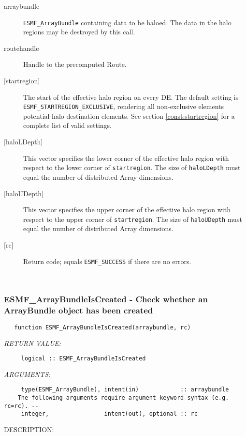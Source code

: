      \begin{description}
     \item [arraybundle]
       {\tt ESMF\_ArrayBundle} containing data to be haloed. The data in the halo
       regions may be destroyed by this call.
     \item [routehandle]
       Handle to the precomputed Route.
     \item [{[startregion]}]
       \begin{sloppypar}
       The start of the effective halo region on every DE. The default
       setting is {\tt ESMF\_STARTREGION\_EXCLUSIVE}, rendering all non-exclusive
       elements potential halo destination elements.
       See section \ref{const:startregion} for a complete list of
       valid settings.
       \end{sloppypar}
     \item[{[haloLDepth]}] 
       This vector specifies the lower corner of the effective halo
       region with respect to the lower corner of {\tt startregion}.
       The size of {\tt haloLDepth} must equal the number of distributed Array
       dimensions.
     \item[{[haloUDepth]}] 
       This vector specifies the upper corner of the effective halo
       region with respect to the upper corner of {\tt startregion}.
       The size of {\tt haloUDepth} must equal the number of distributed Array
       dimensions.
     \item [{[rc]}]
       Return code; equals {\tt ESMF\_SUCCESS} if there are no errors.
     \end{description}
   
 
\mbox{}\hrulefill\ 
 
\subsubsection [ESMF\_ArrayBundleIsCreated] {ESMF\_ArrayBundleIsCreated - Check whether an ArrayBundle object has been created}


 
\begin{verbatim}   function ESMF_ArrayBundleIsCreated(arraybundle, rc)\end{verbatim}{\em RETURN VALUE:}
\begin{verbatim}     logical :: ESMF_ArrayBundleIsCreated\end{verbatim}{\em ARGUMENTS:}
\begin{verbatim}     type(ESMF_ArrayBundle), intent(in)            :: arraybundle
 -- The following arguments require argument keyword syntax (e.g. rc=rc). --
     integer,                intent(out), optional :: rc
 \end{verbatim}
{\sf DESCRIPTION:\\ }


